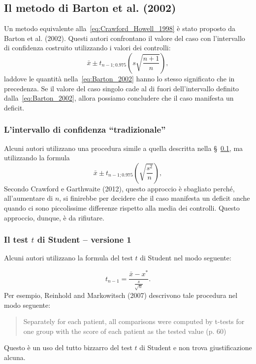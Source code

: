 \subsection{Il metodo di Barton et al. (2002)}
\label{sec:barton_2002}

Un metodo equivalente alla~\eqref{eq:Crawford_Howell_1998} è stato proposto da  Barton et al. (2002).
Questi autori confrontano il valore del caso con l'intervallo di confidenza costruito utilizzando i valori dei controlli:
\begin{equation}
\bar{x} \pm t_{n-1; 0.975} \left(s \sqrt{\frac{n+1}{n}} \right),
\label{eq:Barton_2002}
\end{equation}
laddove le quantità nella~\eqref{eq:Barton_2002} hanno lo stesso significato che in precedenza.
Se il valore del caso singolo cade al di fuori dell'intervallo definito dalla~\eqref{eq:Barton_2002}, allora possiamo concludere che il caso manifesta un deficit.


\subsubsection{L'intervallo di confidenza ``tradizionale''}

Alcuni autori utilizzano una procedura simile a quella descritta nella \S~\ref{sec:barton_2002}, ma utilizzando la formula 
\begin{equation}
\bar{x} \pm t_{n-1; 0.975} \left(\sqrt{\frac{s^2}{n}} \right),
\label{eq:Barton_2002_b}
\end{equation}
Secondo Crawford e Garthwaite (2012), questo approccio è sbagliato perché, all'aumentare di $n$, si finirebbe per decidere che il caso manifesta un deficit anche quando ci sono piccolissime differenze rispetto alla media dei controlli.
Questo approccio, dunque, è da rifiutare.


\subsubsection{Il test $t$ di Student -- versione 1}

Alcuni autori utilizzano la formula del test $t$ di Student nel modo seguente:

\begin{equation}
t_{n-1} = \frac{\bar{x} - x^*}{\frac{s}{\sqrt{n}}}.
\label{eq:ttest_mean_case}
\end{equation}
Per esempio, Reinhold and Markowitsch (2007) descrivono tale procedura nel modo seguente:
\begin{quote}
Separately for each patient, all comparisons were computed by t-tests for one group with the score of each patient as the tested value (p. 60)
\end{quote}
Questo è un uso del tutto bizzarro del test $t$ di Student e non trova giustificazione alcuna.


